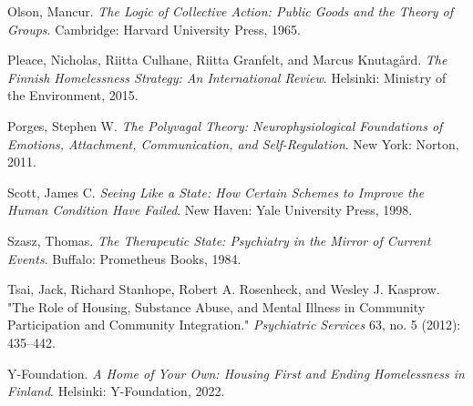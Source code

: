\documentclass[12pt, letterpaper]{article}
\begin{document}
Olson, Mancur. \textit{The Logic of Collective Action: Public Goods and the Theory of Groups}. Cambridge: Harvard University Press, 1965.

Pleace, Nicholas, Riitta Culhane, Riitta Granfelt, and Marcus Knutagård. \textit{The Finnish Homelessness Strategy: An International Review}. Helsinki: Ministry of the Environment, 2015.

Porges, Stephen W. \textit{The Polyvagal Theory: Neurophysiological Foundations of Emotions, Attachment, Communication, and Self-Regulation}. New York: Norton, 2011.

Scott, James C. \textit{Seeing Like a State: How Certain Schemes to Improve the Human Condition Have Failed}. New Haven: Yale University Press, 1998.

Szasz, Thomas. \textit{The Therapeutic State: Psychiatry in the Mirror of Current Events}. Buffalo: Prometheus Books, 1984.

Tsai, Jack, Richard Stanhope, Robert A. Rosenheck, and Wesley J. Kasprow. "The Role of Housing, Substance Abuse, and Mental Illness in Community Participation and Community Integration." \textit{Psychiatric Services} 63, no. 5 (2012): 435–442.

Y-Foundation. \textit{A Home of Your Own: Housing First and Ending Homelessness in Finland}. Helsinki: Y-Foundation, 2022.
\end{document}
